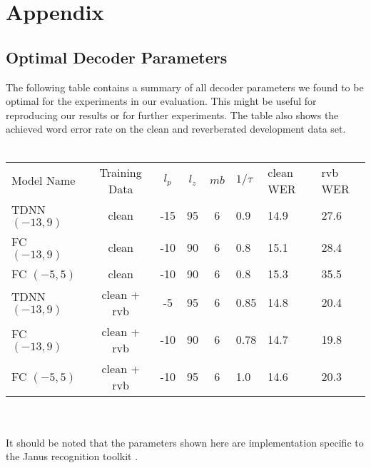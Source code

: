 

\chapter{Appendix}
\label{ch:appendix}
\section{Optimal Decoder Parameters}
The following table contains a summary of all decoder parameters we found to be optimal for the experiments in our evaluation. This might be useful for reproducing our results or for further experiments. The table also shows the achieved word error rate on the clean and reverberated development data set. \\ \\ 
\begin{minipage}{\linewidth}
	\centering
	\begin{tabular}{@{\extracolsep{4pt}}lcccclll@{}}
		\toprule
		Model Name      & Training Data & $l_p$ & $l_z$ & $mb$ &  $1/\tau$ & clean WER & rvb WER \\\cmidrule[1pt]{1-1}\cmidrule[1pt]{2-8}
		TDNN $(-13, 9)$ & clean         & -15   & 95    & 6     & 0.9       & 14.9 & 27.6 \\
		FC $(-13, 9)$   & clean         & -10   & 90    & 6     & 0.8       & 15.1 & 28.4 \\
		FC $(-5, 5)$    & clean         & -10   & 90    & 6     & 0.8       & 15.3 & 35.5  \\\cmidrule[1pt]{1-1}\cmidrule[1pt]{2-8}
		TDNN $(-13, 9)$ & clean + rvb   & -5    & 95    & 6     & 0.85      & 14.8 & 20.4 \\
		FC $(-13, 9)$   & clean + rvb   & -10   & 90    & 6     & 0.78      & 14.7 & 19.8 \\
		FC $(-5, 5)$    & clean + rvb   & -10   & 95    & 6     & 1.0       & 14.6 & 20.3\\
		\bottomrule
	\end{tabular}
	\label{tbl:decoder_params}
\end{minipage} \\ \\
It should be noted that the parameters shown here are implementation specific to the Janus recognition toolkit \cite{finke1997karlsruhe}.